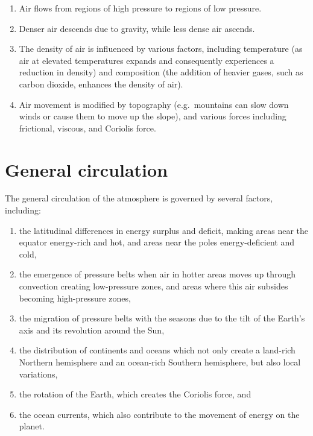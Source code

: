\documentclass[
  12 pt,
]{Nemilov}
\begin{document}
\begin{enumerate}
\def\labelenumi{\arabic{enumi}.}
\item
  Air flows from regions of high pressure to regions of low pressure.
\item
  Denser air descends due to gravity, while less dense air ascends.
\item
  The density of air is influenced by various factors, including temperature (as air at elevated temperatures expands and consequently experiences a reduction in density) and composition (the addition of heavier gases, such as carbon dioxide, enhances the density of air).
\item
  Air movement is modified by topography (e.g.~mountains can slow down winds or cause them to move up the slope), and various forces including frictional, viscous, and Coriolis force.
\end{enumerate}

\section{General circulation}\label{general-circulation}

The general circulation of the atmosphere is governed by several factors, including:

\begin{enumerate}
\def\labelenumi{\arabic{enumi}.}
\item
  the latitudinal differences in energy surplus and deficit, making areas near the equator energy-rich and hot, and areas near the poles energy-deficient and cold,
\item
  the emergence of pressure belts when air in hotter areas moves up through convection creating low-pressure zones, and areas where this air subsides becoming high-pressure zones,
\item
  the migration of pressure belts with the seasons due to the tilt of the Earth's axis and its revolution around the Sun,
\item
  the distribution of continents and oceans which not only create a land-rich Northern hemisphere and an ocean-rich Southern hemisphere, but also local variations,
\item
  the rotation of the Earth, which creates the Coriolis force, and
\item
  the ocean currents, which also contribute to the movement of energy on the planet.
\end{enumerate}
\end{document}
